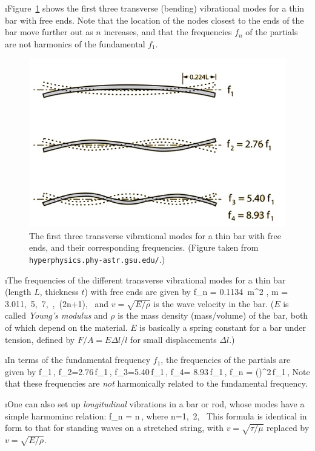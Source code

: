 \i Figure~\ref{f:freebar} shows the first three
transverse (bending) vibrational modes for a thin bar with 
free ends.
Note that the location of the nodes closest to
the ends of the bar move further out 
as $n$ increases, and that the frequencies $f_n$ of 
the partials are not harmonics of the fundamental $f_1$.
%
\begin{figure}[htbp]
\begin{center}
\includegraphics[width=.7\textwidth]{freebar.jpg}
\caption{
The first three transverse vibrational modes for 
a thin bar with free ends, and their corresponding
frequencies.
(Figure taken from 
{\tt hyperphysics.phy-astr.gsu.edu/}.)}
\label{f:freebar}
\end{center}
\end{figure}

\i The frequencies of the different transverse 
vibrational modes for a thin bar 
(length $L$, thickness $t$) with free ends are given by
%
\be
f_n = 0.1134\, m^2\,\,,
\quad
m = 3.011,\ 5,\ 7,\ \cdots,\ (2n+1),\ \cdots
\ee
%
and $v=\sqrt{E/\rho}$ is the wave velocity in the bar.
($E$ is called {\em Young's modulus} and $\rho$ is 
the mass density (mass/volume) of the bar, both of 
which depend on the material.
$E$ is basically a spring constant for a 
bar under tension, defined by $F/A = E \Delta l/l$
for small displacements $\Delta l$.)

\i In terms of the fundamental frequency $f_1$, the 
frequencies of the partials are given by
%
\be
f_1\,,
\quad
f_2=2.76\,f_1\,,
\quad
f_3=5.40\,f_1\,,
\quad
f_4= 8.93\,f_1\,,
\quad
\cdots
\quad
f_n = \left(\right)^2\,f_1\,,
\quad
\cdots
\ee
%
Note that these frequencies are {\em not} harmonically
related to the fundamental frequency.
 
\i One can also set up {\em longitudinal} 
vibrations in a bar or rod, whose modes have a
simple harmominc relation:
%
\be
f_n = n\,,
\quad
{\rm where}\quad
n=1,\ 2,\ \cdots
\ee
%
This formula is identical in form to that for
standing waves on a stretched string, with 
$v=\sqrt{\tau/\mu}$ replaced by $v=\sqrt{E/\rho}$.

